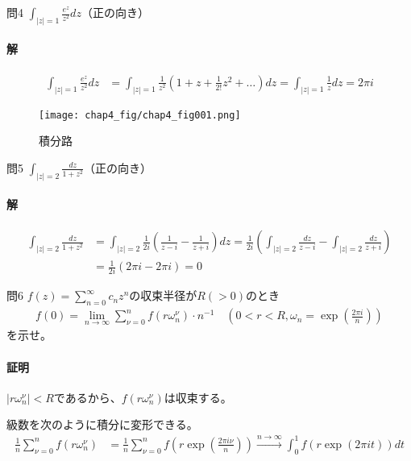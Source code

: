 \begin{mysimplebox}{問4}
   $\int_{|z|=1}\frac{e^z}{z^2}dz$（正の向き）
\end{mysimplebox}
\paragraph{解}
\begin{align*}
   \int_{|z|=1}\frac{e^z}{z^2}dz
   &=\int_{|z|=1}\frac{1}{z^2}\left(1+z+\frac{1}{2!}z^2+\dots\right)dz
   =\int_{|z|=1}\frac{1}{z}dz=2\pi i
\end{align*}

\begin{figure}[h]
   \centering
   \texttt{[image: chap4\_fig/chap4\_fig001.png]}
   \caption{積分路}
   \label{fig:chap4}
\end{figure}

\begin{mysimplebox}{問5}
   $\int_{|z|=2}\frac{dz}{1+z^2}$（正の向き）
\end{mysimplebox}
\paragraph{解}
\begin{align*}
   \int_{|z|=2}\frac{dz}{1+z^2}
   &=\int_{|z|=2}\frac{1}{2i}\left(\frac{1}{z-i}-\frac{1}{z+i}\right)dz
   =\frac{1}{2i}\left(\int_{|z|=2}\frac{dz}{z-i}-\int_{|z|=2}\frac{dz}{z+i}\right)\\
   &=\frac{1}{2i}(2\pi i-2\pi i)=0
\end{align*}

\begin{mysimplebox}{問6}
   $f(z)=\sum_{n=0}^{\infty}c_nz^n$の収束半径が$R(>0)$のとき
   \begin{align*}
      f(0)=\lim_{n\to\infty}\sum_{\nu=0}^{n}f(r\omega_n^\nu)\cdot n^{-1}\quad\left(0<r<R, \omega_n=\exp\left(\frac{2\pi i}{n}\right)\right)
   \end{align*}
   を示せ。
\end{mysimplebox}
\paragraph{証明}
$|r\omega_n^\nu|<R$であるから、$f(r\omega_n^\nu)$は収束する。

級数を次のように積分に変形できる。
\begin{align*}
   \frac{1}{n}\sum_{\nu=0}^{n}f(r\omega_n^\nu)
   &=\frac{1}{n}\sum_{\nu=0}^{n}f\left(r\exp\left(\frac{2\pi i\nu}{n}\right)\right)
   \overset{n\longrightarrow\infty}{\longrightarrow}
   \int_{0}^{1}f(r\exp(2\pi it))dt
\end{align*}

